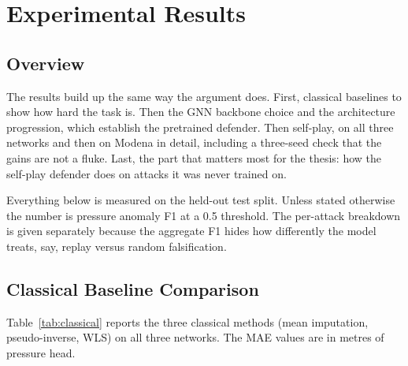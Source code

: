 \chapter{Experimental Results}
\label{ch:results}

\section{Overview}
\label{sec:results_overview}

The results build up the same way the argument does. First, classical
baselines to show how hard the task is. Then the GNN backbone choice
and the architecture progression, which establish the pretrained
defender. Then self-play, on all three networks and then on Modena
in detail, including a three-seed check that the gains are not a
fluke. Last, the part that matters most for the thesis: how the
self-play defender does on attacks it was never trained on.

Everything below is measured on the held-out test split. Unless
stated otherwise the number is pressure anomaly F1 at a 0.5
threshold. The per-attack breakdown is given separately because the
aggregate F1 hides how differently the model treats, say, replay
versus random falsification.

\section{Classical Baseline Comparison}
\label{sec:classical_results}

Table~\ref{tab:classical} reports the three classical methods
(mean imputation, pseudo-inverse, WLS) on all three
networks. The MAE values are in metres of pressure head.

